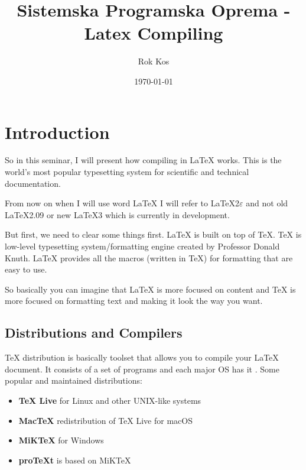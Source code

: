 \documentclass[a4paper,oneside,8pt]{extarticle}
\title{\Title}
\author{\Author}
\date{\today}
\newcommand{\Title}{Sistemska Programska Oprema - Latex Compiling}
\newcommand{\Author}{Rok Kos}
\newcommand{\latex}{\LaTeX\xspace}
\newcommand{\tex}{\TeX\xspace}
\begin{document}
\title{\Title}

\author{\Author}

\maketitle

\pagebreak

\tableofcontents

\listoffigures

\pagebreak

\section{Introduction}
So in this seminar, I will present how compiling in \latex works. This is the world's most popular typesetting system for scientific and technical documentation.

From now on when I will use word \latex I will refer to \LaTeX2$\varepsilon$ and not old \LaTeX2.09 or new LaTeX3 which is currently in development.

But first, we need to clear some things first. \latex is built on top of \tex. \tex is low-level typesetting system/formatting engine created by Professor Donald Knuth. 
 \latex provides all the macros (written in \tex) for formatting that are easy to use.  

So basically you can imagine that \latex is more focused on content and \tex is more focused on formatting text and making it look the way you want.

\subsection{Distributions and Compilers}
\tex distribution is basically toolset that allows you to compile your \latex document. It consists of a set of programs and each major OS has it \cite{Latex_project_distributions} \cite{Overleaf_Compilers}.
Some popular and maintained distributions:
\begin{itemize}
	\item \textbf{TeX Live} for Linux and other UNIX-like systems 
	\item \textbf{MacTeX} redistribution of TeX Live for macOS 
	\item \textbf{MiKTeX} for Windows 
	\item \textbf{proTeXt} is based on MiKTeX 
\end{itemize}
\end{document}
